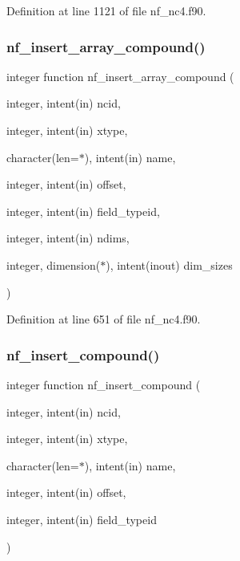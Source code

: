 Definition at line 1121 of file nf\+\_\+nc4.\+f90.

\mbox{\label{nf__nc4_8f90_a12a9918d1da01e7c69d3b2c5df98f302}} 
\subsubsection{\texorpdfstring{nf\+\_\+insert\+\_\+array\+\_\+compound()}{nf\_insert\_array\_compound()}}
{\footnotesize\ttfamily integer function nf\+\_\+insert\+\_\+array\+\_\+compound (\begin{DoxyParamCaption}\item[{integer, intent(in)}]{ncid,  }\item[{integer, intent(in)}]{xtype,  }\item[{character(len=$\ast$), intent(in)}]{name,  }\item[{integer, intent(in)}]{offset,  }\item[{integer, intent(in)}]{field\+\_\+typeid,  }\item[{integer, intent(in)}]{ndims,  }\item[{integer, dimension($\ast$), intent(inout)}]{dim\+\_\+sizes }\end{DoxyParamCaption})}



Definition at line 651 of file nf\+\_\+nc4.\+f90.

\mbox{\label{nf__nc4_8f90_a5a7f5d9b4ea5fed320a28c2cf6eb98a6}} 
\subsubsection{\texorpdfstring{nf\+\_\+insert\+\_\+compound()}{nf\_insert\_compound()}}
{\footnotesize\ttfamily integer function nf\+\_\+insert\+\_\+compound (\begin{DoxyParamCaption}\item[{integer, intent(in)}]{ncid,  }\item[{integer, intent(in)}]{xtype,  }\item[{character(len=$\ast$), intent(in)}]{name,  }\item[{integer, intent(in)}]{offset,  }\item[{integer, intent(in)}]{field\+\_\+typeid }\end{DoxyParamCaption})}



